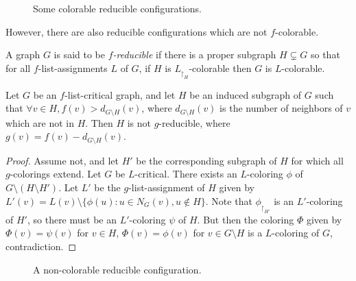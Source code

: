 \begin{figure}

\centering
\begin{subfigure}{0.4\textwidth}
\begin{tikzpicture}

\label{fig:reducible1}
\end{tikzpicture}
\end{subfigure}
\begin{subfigure}{0.4\textwidth}
\begin{tikzpicture}

\end{tikzpicture}
\label{fig:reducible2}
\end{subfigure}
\caption{Some colorable reducible configurations.}
\label{fig:colorablereducible}
\end{figure}

However, there are also reducible configurations which are not $f$-colorable.

\begin{definition}
A graph $G$ is said to be \emph{$f$-reducible} if there is a proper subgraph $H \subsetneq G$ so that
for all $f$-list-assignments $L$ of $G$, if $H$ is $L_{\restriction_H}$-colorable then $G$ is $L$-colorable. 
\end{definition}

\begin{proposition}
Let $G$ be an $f$-list-critical graph, and let $H$ be an induced subgraph of $G$ such that $\forall v \in H, f(v) > d_{G\setminus H}(v)$,
where $d_{G \setminus H}(v)$ is the number of neighbors of $v$ which are not in $H$. Then $H$ is not $g$-reducible, where $g(v) = f(v) -d_{G\setminus H}(v)$.
\end{proposition}

\begin{proof}
Assume not, and let $H'$ be the corresponding subgraph of $H$ for which all $g$-colorings extend. Let $G$ be $L$-critical. 
There exists an $L$-coloring $\phi$ of $G \setminus (H \setminus H')$. Let $L'$ be the $g$-list-assignment of $H$ given by 
$L'(v) = L(v) \setminus \{\phi(u) : u \in N_G(v), u \not\in H\}$. Note that $\phi_{\restriction_{H'}}$ is an $L'$-coloring of $H'$, so there must
be an $L'$-coloring $\psi$ of $H$. But then the coloring $\Phi$ given by $\Phi(v) = \psi(v)$ for $v \in H$, $\Phi(v) = \phi(v)$ for $v \in G \setminus H$ is 
a $L$-coloring of $G$, contradiction. 
\end{proof}

\begin{figure}

\centering
\begin{tikzpicture}

\end{tikzpicture}
\caption{A non-colorable reducible configuration.}
\label{fig:noncolorablereducible}
\end{figure}

